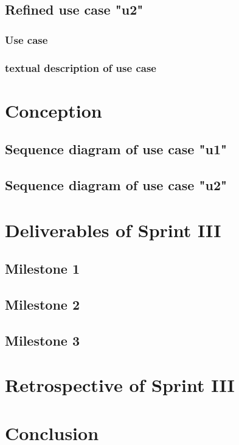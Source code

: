 \subsection{Refined use case "u2"}
\subsubsection{Use case}
\subsubsection{textual description of use case}

\section{Conception}
\subsection{Sequence diagram of use case "u1"}
\subsection{Sequence diagram of use case "u2"}

\section{Deliverables of Sprint III}
\subsection{Milestone 1}
\subsection{Milestone 2}
\subsection{Milestone 3}
\section{Retrospective of Sprint III}
\section{Conclusion}
